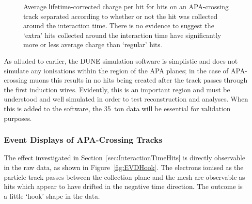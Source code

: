 \begin{figure}
\begin{subfigure}[t]{0.48\linewidth}
    \label{fig:HitChargeNonInteraction}
  \end{subfigure}
  \caption[Average lifetime-corrected charge per hit for hits on an APA-crossing track separated according to whether or not the hit was collected around the interaction time.]{Average lifetime-corrected charge per hit for hits on an APA-crossing track separated according to whether or not the hit was collected around the interaction time.  There is no evidence to suggest the `extra' hits collected around the interaction time have significantly more or less average charge than `regular' hits.}
  \label{fig:HitCharges}
\end{figure}

As alluded to earlier, the DUNE simulation software is simplistic and does not simulate any ionisations within the region of the APA planes; in the case of APA-crossing muons this results in no hits being created after the track passes through the first induction wires.  Evidently, this is an important region and must be understood and well simulated in order to test reconstruction and analyses.  When this is added to the software, the 35~ton data will be essential for validation purposes.

\subsubsection{Event Displays of APA-Crossing Tracks}\label{sec:HookEVDs}

The effect investigated in Section~\ref{sec:InteractionTimeHits} is directly observable in the raw data, as shown in Figure~\ref{fig:EVDHook}.  The electrons ionised as the particle track passes between the collection plane and the mesh are observable as hits which appear to have drifted in the negative time direction.  The outcome is a little `hook' shape in the data.

